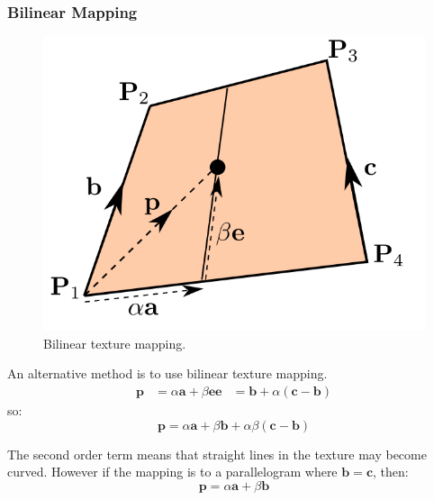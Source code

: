 \documentclass[11pt]{article}
\begin{document}
\subsubsection{Bilinear Mapping}
\begin{figure}[htb!]
  \centering
  \caption{Bilinear texture mapping.}
  \includegraphics[scale=0.3]{bilinearmap}
\end{figure}
An alternative method is to use bilinear texture mapping.
\begin{align*}
  \bm{p} &= \alpha\bm{a} + \beta\bm{e}
  \bm{e} &= \bm{b} + \alpha(\bm{c} - \bm{b})
\end{align*}
so:
\[
  \bm{p} = \alpha\bm{a} + \beta\bm{b} + \alpha\beta(\bm{c} - \bm{b})
\]

The second order term means that straight lines in the texture may become curved.
However if the mapping is to a parallelogram where $\bm{b} = \bm{c}$, then:
\[
  \bm{p} = \alpha\bm{a} + \beta\bm{b}
\]
\end{document}
